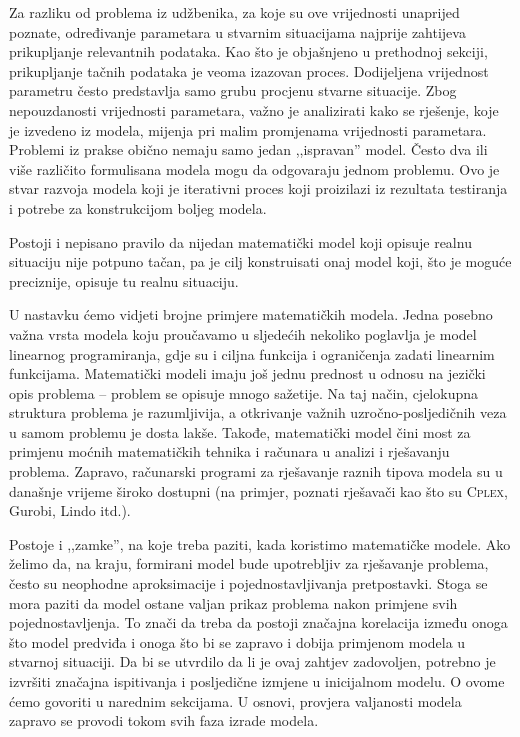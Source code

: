 \documentclass[a4paper, utf8, 11pt, colorlinks]{book}
\theoremstyle{definition}
\begin{document}
Za razliku od problema iz udžbenika, za koje su ove vrijednosti unaprijed poznate,   određivanje parametara u stvarnim situacijama najprije zahtijeva prikupljanje relevantnih podataka. Kao što je objašnjeno u prethodnoj sekciji,  prikupljanje tačnih podataka je veoma izazovan proces. Dodijeljena vrijednost parametru često predstavlja  samo grubu procjenu stvarne situacije. Zbog nepouzdanosti vrijednosti parametara, važno je analizirati kako se rješenje, koje je izvedeno iz modela, mijenja pri malim promjenama vrijednosti parametara. 
 Problemi iz prakse obično nemaju samo jedan ,,ispravan'' model. Često   dva ili više   različito formulisana modela mogu da odgovaraju jednom problemu. 
Ovo je stvar razvoja modela koji je iterativni proces koji proizilazi iz rezultata testiranja i potrebe za konstrukcijom boljeg modela.

Postoji i nepisano pravilo da nijedan matematički model koji opisuje realnu situaciju nije potpuno tačan, pa je cilj konstruisati onaj model koji,  što je moguće preciznije, opisuje tu realnu situaciju.


 U nastavku  ćemo vidjeti brojne primjere matematičkih modela. Jedna posebno važna vrsta modela koju proučavamo u sljedećih nekoliko poglavlja
je model linearnog programiranja, gdje su i ciljna funkcija i ograničenja zadati linearnim funkcijama. 
Matematički modeli imaju još jednu prednost u odnosu na jezički opis problema -- problem se opisuje mnogo sažetije. Na taj način, cjelokupna struktura problema je razumljivija, a otkrivanje važnih uzročno-posljedičnih veza u samom problemu je dosta lakše. Takođe, matematički
model čini most za primjenu moćnih matematičkih tehnika i računara u
analizi i rješavanju problema. Zapravo, računarski programi za rješavanje raznih tipova modela su  u današnje vrijeme  široko dostupni (na primjer, poznati rješavači kao što su \textsc{Cplex}, Gurobi, Lindo itd.). 

  Postoje i ,,zamke'', na koje treba paziti, kada koristimo matematičke modele. Ako želimo da, na kraju, formirani model bude upotrebljiv za rješavanje problema, često  su neophodne aproksimacije i pojednostavljivanja pretpostavki. Stoga se mora paziti da model ostane valjan prikaz problema nakon primjene svih pojednostavljenja. To znači da treba da postoji značajna korelacija između onoga što model predviđa i onoga što bi se zapravo i dobija primjenom modela u stvarnoj situaciji. Da bi se utvrdilo da li je ovaj zahtjev zadovoljen, potrebno je izvršiti značajna ispitivanja i posljedične izmjene u inicijalnom modelu. O ovome ćemo govoriti u narednim sekcijama. U osnovi, provjera valjanosti modela zapravo se provodi tokom svih  faza izrade modela. 
  
\end{document}

